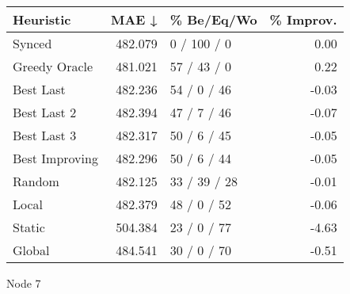 \begin{tabular}{lrlr}
\toprule
\textbf{Heuristic} & \textbf{MAE ↓} & \textbf{\% Be/Eq/Wo} & \textbf{\% Improv.} \\
\midrule
            Synced &        482.079 &          0 / 100 / 0 &                0.00 \\
     Greedy Oracle &        481.021 &          57 / 43 / 0 &                0.22 \\
         Best Last &        482.236 &          54 / 0 / 46 &               -0.03 \\
       Best Last 2 &        482.394 &          47 / 7 / 46 &               -0.07 \\
       Best Last 3 &        482.317 &          50 / 6 / 45 &               -0.05 \\
    Best Improving &        482.296 &          50 / 6 / 44 &               -0.05 \\
            Random &        482.125 &         33 / 39 / 28 &               -0.01 \\
             Local &        482.379 &          48 / 0 / 52 &               -0.06 \\
            Static &        504.384 &          23 / 0 / 77 &               -4.63 \\
            Global &        484.541 &          30 / 0 / 70 &               -0.51 \\
\bottomrule
\end{tabular}
\caption{Node 7}
\label{tab:non_lr01_le2_bs4_7}

